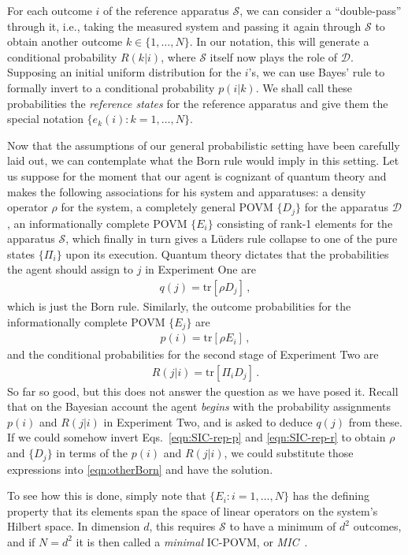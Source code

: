 \documentclass[%
 reprint,superscriptaddress,
 amsmath,amssymb,
 aps,pra, onecolumn, 12pt
]{revtex4-2}
\newcommand{\eqn}[1]{\begin{eqnarray} #1 \end{eqnarray}}
\newcommand{\tit}[1]{\textit{#1}}
\newcommand{\tr}[1]{  \textrm{tr}\left[ #1 \right]  }
\newcommand{\onestage}{{One}}
\newcommand{\twostage}{{Two}}
\begin{document}
For each outcome $i$ of the reference apparatus $\mathcal{S}$, we can consider a ``double-pass'' through it, i.e., taking the measured system and passing it again through $\mathcal{S}$ to obtain another outcome $k \in \{1,\dots,N \}$. In our notation, this will generate a conditional probability $R(k|i)$, where $\mathcal{S}$ itself now plays the role of $\mathcal{D}$.  Supposing an initial uniform distribution for the $i$'s, we can use Bayes' rule to formally invert to a conditional probability $p(i|k)$.  We shall call these probabilities the \tit{reference states} for the reference apparatus and give them the special notation $\{e_k(i) : k = 1,\dots,N \}$.

Now that the assumptions of our general probabilistic setting have been carefully laid out, we can contemplate what the Born rule would imply in this setting. Let us suppose for the moment that our agent is cognizant of quantum theory and makes the following associations for his system and apparatuses:  a density operator $\rho$ for the system, a completely general POVM $\{D_j\}$ for the apparatus $\mathcal{D}$, an informationally complete POVM $\{E_i\}$ consisting of rank-1 elements for the apparatus $\mathcal{S}$, which finally in turn gives a L\"uders rule collapse to one of the pure states $\{\Pi_i\}$ upon its execution. Quantum theory dictates that the probabilities the agent should assign to $j$ in Experiment \onestage{} are
\eqn{ \label{eqn:otherBorn}
q(j) = \tr{\rho D_j} \, ,
}
which is just the Born rule. Similarly, the outcome probabilities for the informationally complete POVM $\{E_j\}$ are
\eqn{ \label{eqn:SIC-rep-p}
p(i) = \tr{\rho E_i} \, ,
}
and the conditional probabilities for the second stage of Experiment \twostage{} are
\eqn{ \label{eqn:SIC-rep-r}
R(j|i) = \tr{\Pi_i D_j} \, .
}
So far so good, but this does not answer the question as we have posed it. Recall that on the Bayesian account the agent \tit{begins} with the probability assignments $p(i)$ and $R(j|i)$ in Experiment \twostage, and is asked to deduce $q(j)$ from these. If we could somehow invert Eqs.\ \eqref{eqn:SIC-rep-p} and \eqref{eqn:SIC-rep-r} to obtain $\rho$ and $\{ D_j\}$ in terms of the $p(i)$ and $R(j|i)$, we could substitute those expressions into \eqref{eqn:otherBorn} and have the solution.

To see how this is done, simply note that $\{E_i : i=1,\dots,N \}$ has the defining property that its elements span the space of linear operators on the system's Hilbert space. In dimension $d$, this requires $\mathcal{S}$ to have a minimum of $d^2$ outcomes, and if $N=d^2$ it is then called a \tit{minimal} IC-POVM, or \tit{MIC}~\cite{DeBrota20c}.
\end{document}
